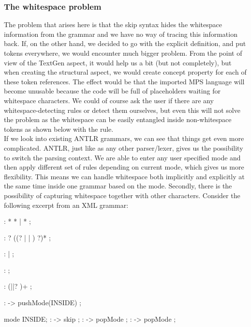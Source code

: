\subsubsection{The whitespace problem}

The problem that arises here is that the skip syntax hides the whitespace information from the grammar and we have no way of tracing this information back. If, on the other hand, we decided to go with the explicit definition, and put  tokens everywhere, we would encounter much bigger problem. From the point of view of the TextGen aspect, it would help us a bit (but not completely), but when creating the structural aspect, we would create concept property for each of these token references. The effect would be that the imported MPS language will become unusable because the code will be full of placeholders waiting for whitespace characters. We could of course ask the user if there are any whitespace-detecting rules or detect them ourselves, but even this will not solve the problem as the whitespace can be easily entangled inside non-whitespace tokens as shown below with the  rule.
\\

If we look into existing ANTLR grammars, we can see that things get even more complicated. ANTLR, just like as any other parser/lexer, gives us the possibility to switch the parsing context. We are able to enter any user specified mode and then apply different set of rules depending on current mode, which gives us more flexibility. This means we can handle whitespace both implicitly and explicitly at the same time inside one grammar based on the mode. Secondly, there is the possibility of capturing whitespace together with other characters. Consider the following excerpt from an XML grammar:

\begin{antlr}
	     :   \literal{<}  * \literal{>} * \literal{</}  \literal{>}
	            |   \literal{<}  * \literal{/>}
	            ;
	
	     :   ? 
                ((? |  | ) ?)* ;
	
	    :    |  ;
	
	        :   \regex{~[<&]+} ;
	
	      :   (\literal{ }||? )+ ;
	
	        :   \literal{<}             -> pushMode(INSIDE) ;
	
	mode INSIDE;
	           :    -> skip ;
	       :   \literal{<}             -> popMode ;
	 :   \literal{/>}            -> popMode ;
\end{antlr}


